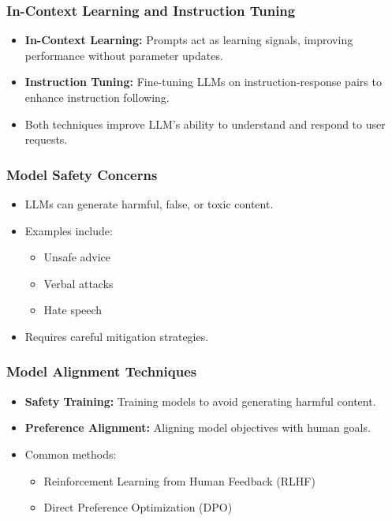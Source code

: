 \begin{frame}
    \frametitle{In-Context Learning and Instruction Tuning}
    \begin{itemize}
        \item \textbf{In-Context Learning:} Prompts act as learning signals, improving performance without parameter updates.
        \item \textbf{Instruction Tuning:} Fine-tuning LLMs on instruction-response pairs to enhance instruction following.
        \item Both techniques improve LLM's ability to understand and respond to user requests.
    \end{itemize}
\end{frame}

\begin{frame}
    \frametitle{Model Safety Concerns}
    \begin{itemize}
        \item LLMs can generate harmful, false, or toxic content.
        \item Examples include:
            \begin{itemize}
                \item Unsafe advice
                \item Verbal attacks
                \item Hate speech
            \end{itemize}
        \item  Requires careful mitigation strategies.
    \end{itemize}
\end{frame}

\begin{frame}
    \frametitle{Model Alignment Techniques}
    \begin{itemize}
        \item \textbf{Safety Training:} Training models to avoid generating harmful content.
        \item \textbf{Preference Alignment:} Aligning model objectives with human goals.
        \item Common methods:
            \begin{itemize}
                \item Reinforcement Learning from Human Feedback (RLHF)
                \item Direct Preference Optimization (DPO)
            \end{itemize}
    \end{itemize}
\end{frame}

